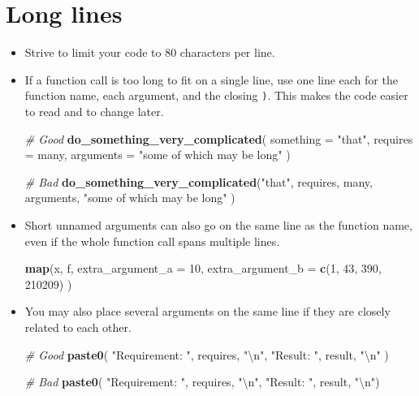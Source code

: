 \documentclass[
]{book}
\newenvironment{Shaded}{\begin{snugshade}}{\end{snugshade}}
\newcommand{\CharTok}[1]{\textcolor[rgb]{0.31,0.60,0.02}{#1}}
\newcommand{\CommentTok}[1]{\textcolor[rgb]{0.56,0.35,0.01}{\textit{#1}}}
\newcommand{\DataTypeTok}[1]{\textcolor[rgb]{0.13,0.29,0.53}{#1}}
\newcommand{\DecValTok}[1]{\textcolor[rgb]{0.00,0.00,0.81}{#1}}
\newcommand{\KeywordTok}[1]{\textcolor[rgb]{0.13,0.29,0.53}{\textbf{#1}}}
\newcommand{\NormalTok}[1]{#1}
\newcommand{\StringTok}[1]{\textcolor[rgb]{0.31,0.60,0.02}{#1}}
\begin{document}
\hypertarget{long-lines-1}{%
\section{Long lines}\label{long-lines-1}}

\begin{itemize}
\item
  Strive to limit your code to 80 characters per line.
\item
  If a function call is too long to fit on a single line, use one line each for
  the function name, each argument, and the closing \texttt{)}. This makes the code
  easier to read and to change later.

\begin{Shaded}
\begin{Highlighting}[]
\CommentTok{# Good}
\KeywordTok{do_something_very_complicated}\NormalTok{(}
    \DataTypeTok{something =} \StringTok{"that"}\NormalTok{,}
    \DataTypeTok{requires =}\NormalTok{ many,}
    \DataTypeTok{arguments =} \StringTok{"some of which may be long"}
\NormalTok{)}

\CommentTok{# Bad}
\KeywordTok{do_something_very_complicated}\NormalTok{(}\StringTok{"that"}\NormalTok{, requires, many, arguments,}
                              \StringTok{"some of which may be long"}
\NormalTok{                             )}
\end{Highlighting}
\end{Shaded}
\item
  Short unnamed arguments can also go on the same line as the function name,
  even if the whole function call spans multiple lines.

\begin{Shaded}
\begin{Highlighting}[]
\KeywordTok{map}\NormalTok{(x, f,}
    \DataTypeTok{extra_argument_a =} \DecValTok{10}\NormalTok{,}
    \DataTypeTok{extra_argument_b =} \KeywordTok{c}\NormalTok{(}\DecValTok{1}\NormalTok{, }\DecValTok{43}\NormalTok{, }\DecValTok{390}\NormalTok{, }\DecValTok{210209}\NormalTok{)}
\NormalTok{)}
\end{Highlighting}
\end{Shaded}
\item
  You may also place several arguments on the same line if they are closely
  related to each other.

\begin{Shaded}
\begin{Highlighting}[]
\CommentTok{# Good}
\KeywordTok{paste0}\NormalTok{(}
    \StringTok{"Requirement: "}\NormalTok{, requires, }\StringTok{"}\CharTok{\textbackslash{}n}\StringTok{"}\NormalTok{,}
    \StringTok{"Result: "}\NormalTok{, result, }\StringTok{"}\CharTok{\textbackslash{}n}\StringTok{"}
\NormalTok{)}

\CommentTok{# Bad}
\KeywordTok{paste0}\NormalTok{(}
    \StringTok{"Requirement: "}\NormalTok{, requires,}
    \StringTok{"}\CharTok{\textbackslash{}n}\StringTok{"}\NormalTok{, }\StringTok{"Result: "}\NormalTok{,}
\NormalTok{    result, }\StringTok{"}\CharTok{\textbackslash{}n}\StringTok{"}\NormalTok{)}
\end{Highlighting}
\end{Shaded}
\end{itemize}
\end{document}
